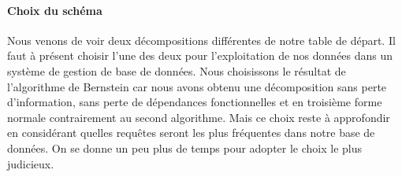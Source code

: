 \paragraph{Choix du schéma}{
    Nous venons de voir deux décompositions différentes de notre table de départ. Il faut à présent choisir l'une des deux pour l'exploitation de nos données dans un système de gestion de base de données. \newline
    Nous choisissons le résultat de l'algorithme de Bernstein car nous avons obtenu une décomposition sans perte d'information, sans perte de dépendances fonctionnelles et en troisième forme normale contrairement au second algorithme. Mais ce choix reste à approfondir en considérant quelles requêtes seront les plus fréquentes dans notre base de données. On se donne un peu plus de temps pour adopter le choix le plus judicieux. 
}
